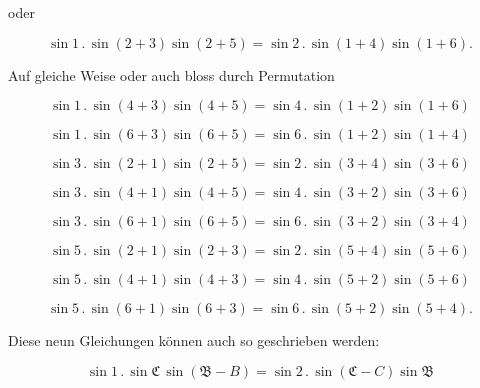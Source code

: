 
oder

\begin{equation}
\sin 1 \, . \, \sin(2+3)\sin(2+5) = \sin 2 \, . \, \sin(1+4)\sin(1+6).
\tag{3}
\end{equation}

Auf gleiche Weise oder auch bloss durch Permutation

\begin{equation}
\sin 1 \, . \, \sin(4+3)\sin(4+5) = \sin 4 \, . \, \sin(1+2)\sin(1+6)
\tag{4}
\end{equation}

\begin{equation}
\sin 1 \, . \, \sin(6+3)\sin(6+5) = \sin 6 \, . \, \sin(1+2)\sin(1+4)
\tag{5}
\end{equation}

\begin{equation}
\sin 3 \, . \, \sin(2+1)\sin(2+5) = \sin 2 \, . \, \sin(3+4)\sin(3+6)
\tag{6}
\end{equation}

\begin{equation}
\sin 3 \, . \, \sin(4+1)\sin(4+5) = \sin 4 \, . \, \sin(3+2)\sin(3+6)
\tag{7}
\end{equation}

\begin{equation}
\sin 3 \, . \, \sin(6+1)\sin(6+5) = \sin 6 \, . \, \sin(3+2)\sin(3+4)
\tag{8}
\end{equation}

\begin{equation}
\sin 5 \, . \, \sin(2+1)\sin(2+3) = \sin 2 \, . \, \sin(5+4)\sin(5+6)
\tag{9}
\end{equation}

\begin{equation}
\sin 5 \, . \, \sin(4+1)\sin(4+3) = \sin 4 \, . \, \sin(5+2)\sin(5+6)
\tag{10}
\end{equation}

\begin{equation}
\sin 5 \, . \, \sin(6+1)\sin(6+3) = \sin 6 \, . \, \sin(5+2)\sin(5+4).
\tag{11}
\end{equation}

Diese neun Gleichungen können auch so geschrieben werden:

\begin{equation}
\sin 1 \, . \, \sin\mathfrak{C} \, \sin(\mathfrak{B}-B) = \sin 2 \, . \, \sin(\mathfrak{C}-C)\sin\mathfrak{B}
\tag{3}
\end{equation}

